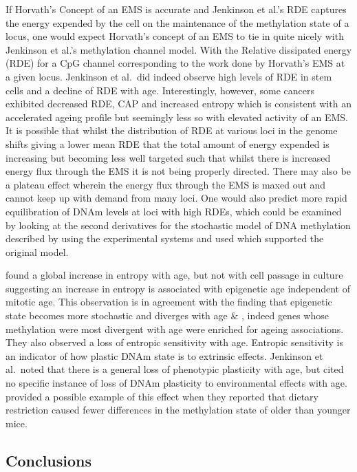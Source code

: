 \documentclass[
]{book}
\begin{document}
If Horvath's Concept of an EMS is accurate and Jenkinson et al.'s RDE captures the energy expended by the cell on the maintenance of the methylation state of a locus, one would expect Horvath's concept of an EMS to tie in quite nicely with Jenkinson et al.'s methylation channel model. With the Relative dissipated energy (RDE) for a CpG channel corresponding to the work done by Horvath's EMS at a given locus. Jenkinson et al.~did indeed observe high levels of RDE in stem cells and a decline of RDE with age. Interestingly, however, some cancers exhibited decreased RDE, CAP and increased entropy which is consistent with an accelerated ageing profile but seemingly less so with elevated activity of an EMS. It is possible that whilst the distribution of RDE at various loci in the genome shifts giving a lower mean RDE that the total amount of energy expended is increasing but becoming less well targeted such that whilst there is increased energy flux through the EMS it is not being properly directed. There may also be a plateau effect wherein the energy flux through the EMS is maxed out and cannot keep up with demand from many loci. One would also predict more rapid equilibration of DNAm levels at loci with high RDEs, which could be examined by looking at the second derivatives for the stochastic model of DNA methylation described by \citet{Pfeifer1990a} using the experimental systems \citet{Laird2004} and \citet{Riggs2004a} used which supported the original model.

\citet{Jenkinson2017} found a global increase in entropy with age, but not with cell passage in culture suggesting an increase in entropy is associated with epigenetic age independent of mitotic age. This observation is in agreement with the finding that epigenetic state becomes more stochastic and diverges with age \citep{Fraga2005} \& \citep{Slieker2016}, indeed genes whose methylation were most divergent with age were enriched for ageing associations. They also observed a loss of entropic sensitivity with age. Entropic sensitivity is an indicator of how plastic DNAm state is to extrinsic effects. Jenkinson et al.~noted that there is a general loss of phenotypic plasticity with age, but cited no specific instance of loss of DNAm plasticity to environmental effects with age. \citet{Hahn2017} provided a possible example of this effect when they reported that dietary restriction caused fewer differences in the methylation state of older than younger mice.

\hypertarget{conclusions}{%
\subsection{Conclusions}\label{conclusions}}
\end{document}
